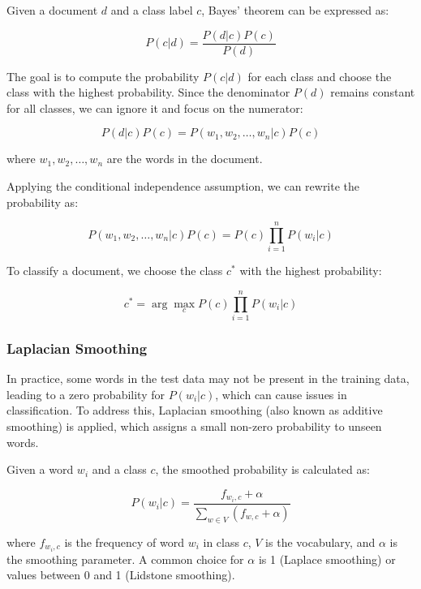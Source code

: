 \documentclass{article}
\begin{document}
Given a document $d$ and a class label $c$, Bayes' theorem can be expressed as:

\begin{equation}
P(c|d) = \frac{P(d|c)P(c)}{P(d)}
\end{equation}

The goal is to compute the probability $P(c|d)$ for each class and choose the class with the highest probability. Since the denominator $P(d)$ remains constant for all classes, we can ignore it and focus on the numerator:

\begin{equation}
P(d|c)P(c) = P(w_1, w_2, \dots, w_n|c)P(c)
\end{equation}

where $w_1, w_2, \dots, w_n$ are the words in the document.

Applying the conditional independence assumption, we can rewrite the probability as:

\begin{equation}
P(w_1, w_2, \dots, w_n|c)P(c) = P(c)\prod_{i=1}^{n} P(w_i|c)
\end{equation}

To classify a document, we choose the class $c^*$ with the highest probability:

\begin{equation}
c^* = \arg\max_c P(c)\prod_{i=1}^{n} P(w_i|c)
\end{equation}

\subsubsection{Laplacian Smoothing}

In practice, some words in the test data may not be present in the training data, leading to a zero probability for $P(w_i|c)$, which can cause issues in classification. To address this, Laplacian smoothing (also known as additive smoothing) is applied, which assigns a small non-zero probability to unseen words.

Given a word $w_i$ and a class $c$, the smoothed probability is calculated as:

\begin{equation}
P(w_i|c) = \frac{f_{w_i, c} + \alpha}{\sum_{w \in V} (f_{w, c} + \alpha)}
\end{equation}

where $f_{w_i, c}$ is the frequency of word $w_i$ in class $c$, $V$ is the vocabulary, and $\alpha$ is the smoothing parameter. A common choice for $\alpha$ is 1 (Laplace smoothing) or values between 0 and 1 (Lidstone smoothing).
\end{document}
